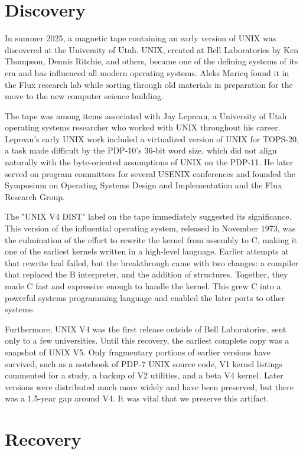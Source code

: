 \section{Discovery}

In summer 2025, a magnetic tape containing an early version of UNIX was discovered at the University of Utah.
UNIX, created at Bell Laboratories by Ken Thompson, Dennis Ritchie, and others, became one of the defining systems of its era and has influenced all modern operating systems.
Aleks Maricq found it in the Flux research lab while sorting through old materials in preparation for the move to the new computer science building.

The tape was among items associated with Jay Lepreau, a University of Utah operating systems researcher who worked with UNIX throughout his career.
Lepreau's early UNIX work included a virtualized version of UNIX for TOPS-20, a task made difficult by the PDP-10's 36-bit word size, which did not align naturally with the byte-oriented assumptions of UNIX on the PDP-11.
He later served on program committees for several USENIX conferences and founded the Symposium on Operating Systems Design and Implementation and the Flux Research Group.

The "UNIX V4 DIST" label on the tape immediately suggested its significance.
This version of the influential operating system, released in November 1973, was the culmination of the effort to rewrite the kernel from assembly to C, making it one of the earliest kernels written in a high-level language.
Earlier attempts at that rewrite had failed, but the breakthrough came with two changes: a compiler that replaced the B interpreter, and the addition of structures.
Together, they made C fast and expressive enough to handle the kernel.
This grew C into a powerful systems programming language and enabled the later ports to other systems.

Furthermore, UNIX V4 was the first release outside of Bell Laboratories, sent only to a few universities.
Until this recovery, the earliest complete copy was a snapshot of UNIX V5.
Only fragmentary portions of earlier versions have survived, such as a notebook of PDP-7 UNIX source code, V1 kernel listings commented for a study, a backup of V2 utilities, and a beta V4 kernel.
Later versions were distributed much more widely and have been preserved, but there was a 1.5-year gap around V4.
It was vital that we preserve this artifact.

\section{Recovery}

